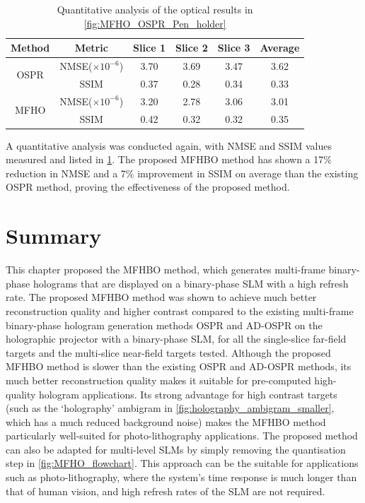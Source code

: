 	\begin{table}[H]
	\centering
	\begin{tabular}{|c|c|c|c|c|c|}
	\hline
	\textbf{Method} & \textbf{Metric} & \textbf{Slice 1} & \textbf{Slice 2} & \textbf{Slice 3} & \textbf{Average} \\ \hline
	\multirow{2}{*}{OSPR} & NMSE($\times 10^{-6}$) & 3.70 & 3.69 & 3.47 & 3.62 \\ \cline{2-6}
						  & SSIM                   & 0.37 & 0.28 & 0.34 & 0.33 \\ \hline
	\multirow{2}{*}{MFHO} & NMSE($\times 10^{-6}$) & 3.20 & 2.78 & 3.06 & 3.01 \\ \cline{2-6}
						  & SSIM                   & 0.42 & 0.32 & 0.32 & 0.35 \\ \hline
	\end{tabular}
	\caption{Quantitative analysis of the optical results in \cref{fig:MFHO_OSPR_Pen_holder}}
	\label{tab:quant_MFHO_Pen_holder}
	\end{table}

	A quantitative analysis was conducted again, with NMSE and SSIM values measured and listed in \cref{tab:quant_MFHO_Pen_holder}. The proposed MFHBO method has shown a 17\% reduction in NMSE and a 7\% improvement in SSIM on average than the existing OSPR method, proving the effectiveness of the proposed method.


\section{Summary}
	This chapter proposed the MFHBO method, which generates multi-frame binary-phase holograms that are displayed on a binary-phase SLM with a high refresh rate. The proposed MFHBO method was shown to achieve much better reconstruction quality and higher contrast compared to the existing multi-frame binary-phase hologram generation methods OSPR \cite{Cable2004} and AD-OSPR \cite{Kaczorowski2016} on the holographic projector with a binary-phase SLM, for all the single-slice far-field targets and the multi-slice near-field targets tested. Although the proposed MFHBO method is slower than the existing OSPR and AD-OSPR methods, its much better reconstruction quality makes it suitable for pre-computed high-quality hologram applications. Its strong advantage for high contrast targets (such as the `holography' ambigram in \cref{fig:holography_ambigram_smaller}, which has a much reduced background noise) makes the MFHBO method particularly well-suited for photo-lithography applications. The proposed method can also be adapted for multi-level SLMs by simply removing the quantisation step in \cref{fig:MFHO_flowchart}. This approach can be the suitable for applications such as photo-lithography, where the system's time response is much longer than that of human vision, and high refresh rates of the SLM are not required.


